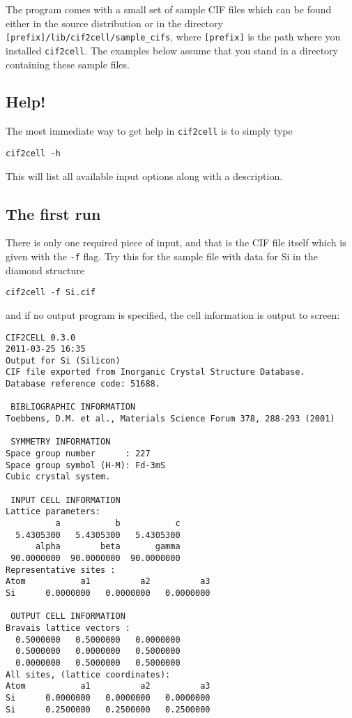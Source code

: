 \documentclass[11pt]{article}
\newcommand{\ciftocell}{\texttt{cif2cell}}
\begin{document}
The program comes with a small set of sample CIF files which can be found either in the source distribution or in the directory \texttt{[prefix]/lib/cif2cell/sample\_cifs}, where \texttt{[prefix]} is the path where you installed \ciftocell. The examples below assume that you stand in a directory containing these sample files.

\subsection{Help!}
The most immediate way to get help in \ciftocell{} is to simply type
\begin{verbatim}
cif2cell -h
\end{verbatim}
This will list all available input options along with a description.

\subsection{The first run}
There is only one required piece of input, and that is the CIF file itself which is given with the \texttt{-f} flag. Try this for the sample file with data for Si in the diamond structure
\begin{verbatim}
cif2cell -f Si.cif
\end{verbatim}
and if no output program is specified, the cell information is output to screen:

\newpage
\begin{verbatim}
CIF2CELL 0.3.0
2011-03-25 16:35
Output for Si (Silicon)
CIF file exported from Inorganic Crystal Structure Database.
Database reference code: 51688.

 BIBLIOGRAPHIC INFORMATION
Toebbens, D.M. et al., Materials Science Forum 378, 288-293 (2001) 

 SYMMETRY INFORMATION
Space group number      : 227
Space group symbol (H-M): Fd-3mS
Cubic crystal system.

 INPUT CELL INFORMATION
Lattice parameters:
          a           b           c 
  5.4305300   5.4305300   5.4305300 
      alpha        beta       gamma 
 90.0000000  90.0000000  90.0000000 
Representative sites :
Atom           a1          a2          a3 
Si      0.0000000   0.0000000   0.0000000

 OUTPUT CELL INFORMATION
Bravais lattice vectors :
  0.5000000   0.5000000   0.0000000 
  0.5000000   0.0000000   0.5000000 
  0.0000000   0.5000000   0.5000000 
All sites, (lattice coordinates):
Atom           a1          a2          a3 
Si      0.0000000   0.0000000   0.0000000
Si      0.2500000   0.2500000   0.2500000\end{verbatim}
\end{document}
